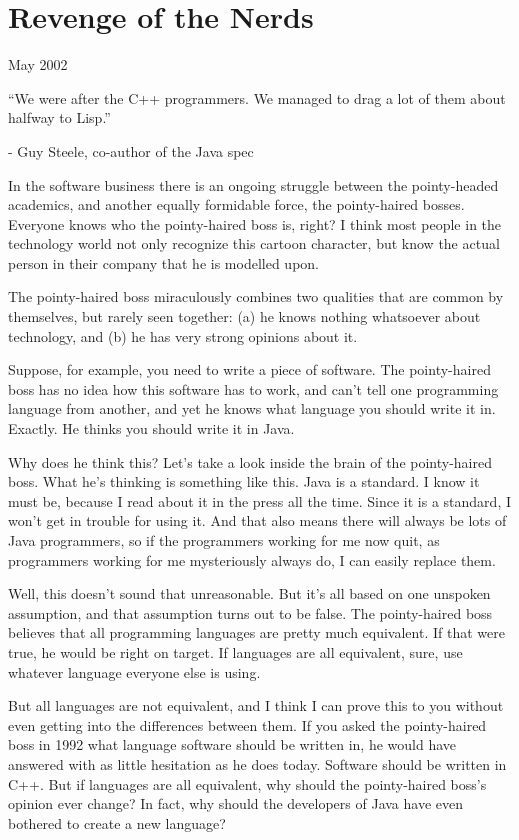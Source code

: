 \documentclass[12pt]{book}
\begin{document}
\chapter{Revenge of the Nerds}

May 2002

``We were after the C++ programmers. We managed to drag a lot of them
about halfway to Lisp.''

- Guy Steele, co-author of the Java spec

In the software business there is an ongoing struggle between the
pointy-headed academics, and another equally formidable force, the
pointy-haired bosses. Everyone knows who the pointy-haired boss is,
right? I think most people in the technology world not only recognize
this cartoon character, but know the actual person in their company that
he is modelled upon.

The pointy-haired boss miraculously combines two qualities that are
common by themselves, but rarely seen together: (a) he knows nothing
whatsoever about technology, and (b) he has very strong opinions about
it.

Suppose, for example, you need to write a piece of software. The
pointy-haired boss has no idea how this software has to work, and can't
tell one programming language from another, and yet he knows what
language you should write it in. Exactly. He thinks you should write it
in Java.

Why does he think this? Let's take a look inside the brain of the
pointy-haired boss. What he's thinking is something like this. Java is a
standard. I know it must be, because I read about it in the press all
the time. Since it is a standard, I won't get in trouble for using it.
And that also means there will always be lots of Java programmers, so if
the programmers working for me now quit, as programmers working for me
mysteriously always do, I can easily replace them.

Well, this doesn't sound that unreasonable. But it's all based on one
unspoken assumption, and that assumption turns out to be false. The
pointy-haired boss believes that all programming languages are pretty
much equivalent. If that were true, he would be right on target. If
languages are all equivalent, sure, use whatever language everyone else
is using.

But all languages are not equivalent, and I think I can prove this to
you without even getting into the differences between them. If you asked
the pointy-haired boss in 1992 what language software should be written
in, he would have answered with as little hesitation as he does today.
Software should be written in C++. But if languages are all equivalent,
why should the pointy-haired boss's opinion ever change? In fact, why
should the developers of Java have even bothered to create a new
language?
\end{document}
